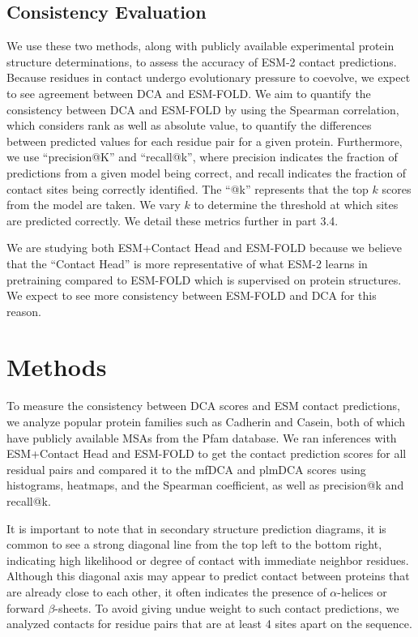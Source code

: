 \documentclass{article}
\begin{document}
\subsection{Consistency Evaluation}

We use these two methods, along with publicly available experimental protein structure determinations, to assess the accuracy of ESM-2 contact predictions. Because residues in contact undergo evolutionary pressure to coevolve, we expect to see agreement between DCA and ESM-FOLD. We aim to quantify the consistency between DCA and ESM-FOLD by using the Spearman correlation, which considers rank as well as absolute value, to quantify the differences between predicted values for each residue pair for a given protein. Furthermore, we use ``precision@K'' and ``recall@k'', where precision indicates the fraction of predictions from a given model being correct, and recall indicates the fraction of contact sites being correctly identified. The ``@k'' represents that the top $k$ scores from the model are taken. We vary $k$ to determine the threshold at which sites are predicted correctly. We detail these metrics further in part 3.4. 

We are studying both ESM+Contact Head and ESM-FOLD because we believe that the ``Contact Head'' is more representative of what ESM-2 learns in pretraining compared to ESM-FOLD which is supervised on protein structures. We expect to see more consistency between ESM-FOLD and DCA for this reason.

\section{Methods}

To measure the consistency between DCA scores and ESM contact predictions, we analyze popular protein families such as Cadherin and Casein, both of which have publicly available MSAs from the Pfam database. We ran inferences with ESM+Contact Head and ESM-FOLD to get the contact prediction scores for all residual pairs and compared it to the mfDCA and plmDCA scores using histograms, heatmaps, and the Spearman coefficient, as well as precision@k and recall@k. 

It is important to note that in secondary structure prediction diagrams, it is common to see a strong diagonal line from the top left to the bottom right, indicating high likelihood or degree of contact with immediate neighbor residues. Although this diagonal axis may appear to predict contact between proteins that are already close to each other, it often indicates the presence of $\alpha$-helices or forward $\beta$-sheets. To avoid giving undue weight to such contact predictions, we analyzed contacts for residue pairs that are at least 4 sites apart on the sequence.
\end{document}
